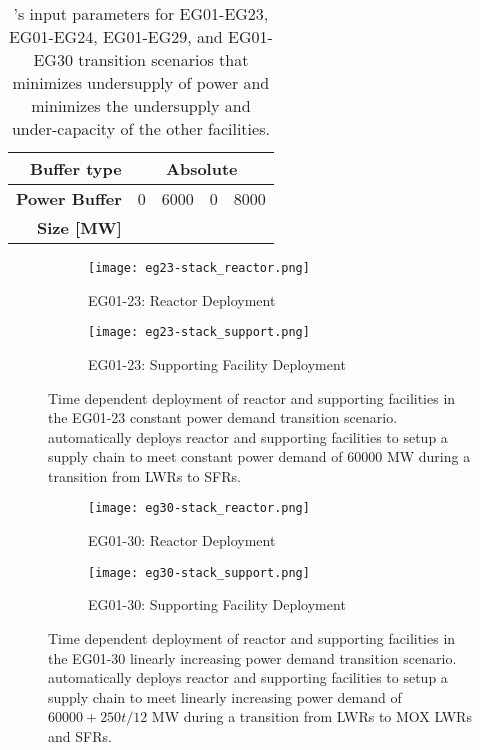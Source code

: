 \begin{table}[]
\begin{tabular}{r|cccc}
	\textbf{Buffer type}                                                    & \multicolumn{4}{c}{Absolute}                                                                                                                                                                                                                                                               \\ \hline
	\textbf{Power Buffer}                                                  & 0 & 6000 & 0 & 8000 \\ 
	\textbf{Size [MW]} \\ \hline \end{tabular}
	\caption{\deploy's input parameters for EG01-EG23, EG01-EG24, EG01-EG29, and 
	EG01-EG30 transition scenarios
	that minimizes undersupply of power and minimizes 
	the undersupply and under-capacity of the other facilities. }
	\label{tab:bestinputs}
	\end{table}

\begin{figure}[]
	\centering
	\begin{subfigure}[t]{1.2\textwidth}
		\centering
		\texttt{[image: eg23-stack\_reactor.png]} 
		\caption{EG01-23: Reactor Deployment}
		\label{fig:23reactor}
	\end{subfigure}
	\vspace{1cm}
	\begin{subfigure}[t]{1.2\textwidth}
		\centering
		\texttt{[image: eg23-stack\_support.png]} 
		\caption{EG01-23: Supporting Facility Deployment}
		\label{fig:23support}
	\end{subfigure}
	\hfill
	\caption{Time dependent deployment of reactor and supporting facilities in 
	the EG01-23 constant power demand transition scenario. 
	\deploy automatically deploys reactor and supporting facilities 
	to setup a supply chain to meet constant power demand of $60000$ MW
	during a transition from \glspl{LWR} to \glspl{SFR}. }
	\label{fig:23stack}
\end{figure}

\begin{figure}[]
	\centering
	\begin{subfigure}[t]{1.2\textwidth}
		\centering
		\texttt{[image: eg30-stack\_reactor.png]} 
		\caption{EG01-30: Reactor Deployment}
		\label{fig:30reactor}
	\end{subfigure}
	\vspace{1cm}
	\begin{subfigure}[t]{1.2\textwidth}
		\centering
		\texttt{[image: eg30-stack\_support.png]} 
		\caption{EG01-30: Supporting Facility Deployment}
		\label{fig:30support}
	\end{subfigure}
	\hfill
	\caption{Time dependent deployment of reactor and supporting facilities in 
	the EG01-30 linearly increasing power demand transition scenario. 
	\deploy automatically deploys reactor and supporting facilities 
	to setup a supply chain to meet linearly increasing power demand of $60000 + 250t/12$ MW
	during a transition from \glspl{LWR} to MOX LWRs and \glspl{SFR}. }
	\label{fig:30stack}
\end{figure}

